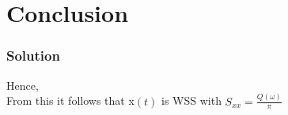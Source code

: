 \documentclass{beamer}
\providecommand{\brak}[1]{\ensuremath{\left(#1\right)}}
\begin{document}
\section{Conclusion}
\begin{frame}
\frametitle{Solution}
Hence,\\
From this it follows that x\brak{t} is WSS with $S_{xx} = \frac{Q\brak{\omega}}{\pi}$
\end{frame}
\end{document}

